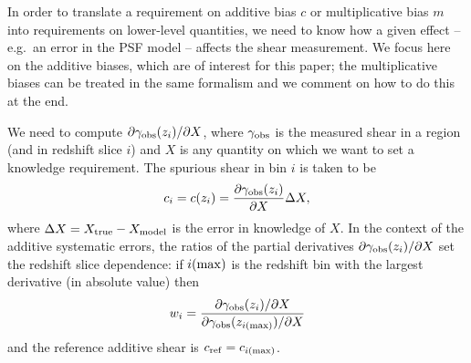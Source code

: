 \documentclass[usenatbib]{mnras}
\begin{document}

In order to translate a requirement on additive bias $c$ or multiplicative bias $m$ into requirements on lower-level quantities, we need to know how a given effect -- e.g.\ an error in the PSF model -- affects the shear measurement. We focus here on the additive biases, which are of interest for this paper; the multiplicative biases can be treated in the same formalism and we comment on how to do this at the end.

We need to compute $\partial\gamma_{\rm obs}(z_i)/\partial X$, where $\gamma_{\rm obs}$ is the measured shear in a region (and in redshift slice $i$) and $X$ is any quantity on which we want to set a knowledge requirement. The spurious shear in bin $i$ is taken to be
\begin{equation}
c_i = c(z_i) = \frac{\partial\gamma_{\rm obs}(z_i)}{\partial X} \Delta X,
\label{eq:X-shape}
\end{equation}
where $\Delta X = X_{\rm true} - X_{\rm model}$ is the error in
knowledge of $X$. In the context of the additive systematic errors,
the ratios of the partial derivatives $\partial\gamma_{\rm
obs}(z_i)/\partial X$ set the redshift slice dependence: if $i({\rm
max})$ is the redshift bin with the largest derivative (in absolute
value) then
\begin{equation}
w_i = \frac{\partial\gamma_{\rm obs}(z_i)/\partial X}{\partial\gamma_{\rm obs}(z_{i({\rm max})})/\partial X}
\end{equation}
and the reference additive shear is $c_{\rm ref} = c_{i({\rm max})}$.
\end{document}
